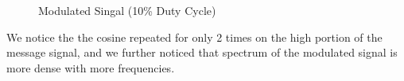 \documentclass[12pt]{article}
\begin{document}
\begin{figure}[H]
    \centering
    \caption{Modulated Singal (10\% Duty Cycle)}
\end{figure}
We notice the the cosine repeated for only 2 times on the high portion of the message signal, and we further noticed that spectrum of the modulated signal is more dense with more frequencies.
\end{document}
